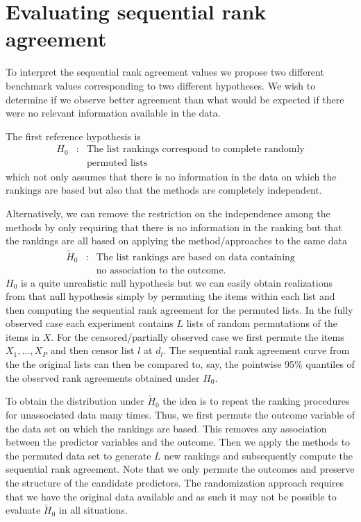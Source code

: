 \documentclass[12pt,a4paper]{article}
\newcommand{\nn}{\nonumber}
\theoremstyle{plain}
\begin{document}
\section{Evaluating sequential rank agreement}
To interpret the sequential rank agreement values we propose two
different benchmark values corresponding to two different
hypotheses. We wish to determine if we observe better agreement than
what would be expected if there were no relevant information available
in the data.

The first reference hypothesis is
\begin{eqnarray}
H_0  & : &  \text{The list rankings correspond to complete randomly}\label{eq:permutationHypothesis}\\
       &  & \text{permuted lists}\nn
\end{eqnarray}
which not only assumes that there is no information in the data on
which the rankings are based but also that the methods are completely
independent.

Alternatively, we can remove the restriction on the independence among
the methods by only requiring that there is no information in the
ranking but that the rankings are all based on applying the
method/approaches to the same data
\begin{eqnarray*}
\widetilde H_0 & :&  \text{The list rankings are based on data containing}\\
& &   \text{no association to the outcome.}
\end{eqnarray*}
$H_0$ is a quite unrealistic null hypothesis but we can easily obtain
realizations from that null hypothesis simply by permuting the items
within each list and then computing the sequential rank agreement for
the permuted lists. In the fully observed case each experiment
contains $L$ lists of random permutations of the items in $X$. For the
censored/partially observed case we first permute the items
$X_1,\dots,X_P$ and then censor list $l$ at $d_l$. The sequential rank
agreement curve from the the original lists can then be compared to,
say, the pointwise 95\% quantiles of the observed rank agreements
obtained under $H_0$.

To obtain the distribution under $\widetilde H_0$ the idea is to
repeat the ranking procedures for unassociated data many times.  Thus,
we first permute the outcome variable of the data set on which the
rankings are based. This removes any association between the predictor
variables and the outcome. Then we apply the methods to the permuted
data set to generate $L$ new rankings and subsequently compute the
sequential rank agreement. Note that we only permute the outcomes and
preserve the structure of the candidate predictors. The randomization
approach requires that we have the original data available and as such
it may not be possible to evaluate $\widetilde H_0$ in all situations.
\end{document}

